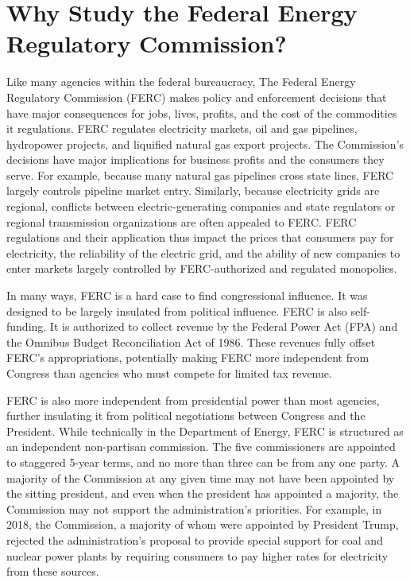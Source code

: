 \documentclass{article}
\begin{document}
\section{Why Study the Federal Energy Regulatory Commission?}
Like many agencies within the federal bureaucracy, The Federal Energy Regulatory Commission (FERC) makes policy and enforcement decisions that have major consequences for jobs, lives, profits, and the cost of the commodities it regulations. FERC regulates electricity markets, oil and gas pipelines, hydropower projects, and liquified natural gas export projects. The Commission's decisions have major implications for business profits and the consumers they serve. For example, because many natural gas pipelines cross state lines, FERC largely controls pipeline market entry. Similarly, because electricity grids are regional, conflicts between electric-generating companies and state regulators or regional transmission organizations are often appealed to FERC. FERC regulations and their application thus impact the prices that consumers pay for electricity, the reliability of the electric grid, and the ability of new companies to enter markets largely controlled by FERC-authorized and regulated monopolies. 

In many ways, FERC is a hard case to find congressional influence. It was designed to be largely insulated from political influence.  FERC is also self-funding. It is authorized to collect revenue by the Federal Power Act (FPA) and the Omnibus Budget Reconciliation Act of 1986. These revenues fully offset FERC's appropriations, potentially making FERC more independent from Congress than agencies who must compete for limited tax revenue.

FERC is also more independent from presidential power than most agencies, further insulating it from political negotiations between Congress and the President. While technically in the Department of Energy, FERC is structured as an independent non-partisan commission. The five commissioners are appointed to staggered 5-year terms, and no more than three can be from any one party. A majority of the Commission at any given time may not have been appointed by the sitting president, and even when the president has appointed a majority, the Commission may not support the administration's priorities. For example, in 2018, the Commission, a majority of whom were appointed by President Trump, rejected the administration's proposal to provide special support for coal and nuclear power plants by requiring consumers to pay higher rates for electricity from these sources.
\end{document}
